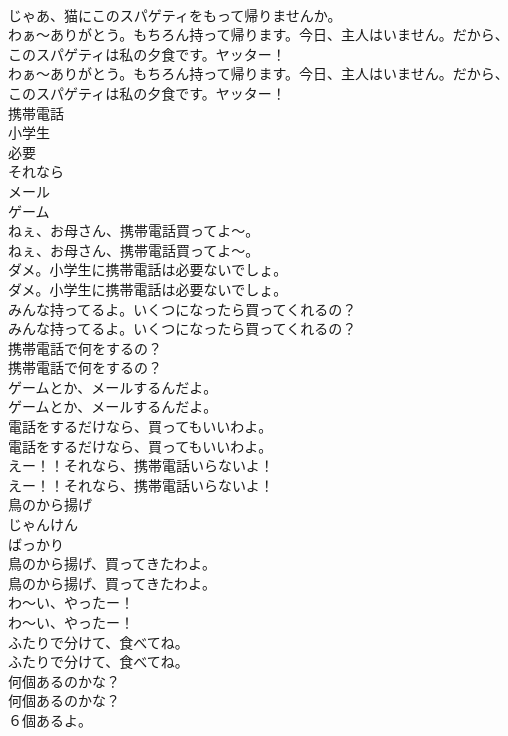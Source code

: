 \documentclass[8pt]{extreport}
\begin{document}
\begin{CJK}{UTF8}{min}
\\	じゃあ、猫にこのスパゲティをもって帰りませんか。 
\\	わぁ〜ありがとう。もちろん持って帰ります。今日、主人はいません。だから、このスパゲティは私の夕食です。ヤッター！	
\\	わぁ〜ありがとう。もちろん持って帰ります。今日、主人はいません。だから、このスパゲティは私の夕食です。ヤッター！ 
\\	携帯電話
\\	小学生
\\	必要
\\	それなら
\\	メール
\\	ゲーム
\\	ねぇ、お母さん、携帯電話買ってよ～。	
\\	ねぇ、お母さん、携帯電話買ってよ～。 
\\	ダメ。小学生に携帯電話は必要ないでしょ。	
\\	ダメ。小学生に携帯電話は必要ないでしょ。 
\\	みんな持ってるよ。いくつになったら買ってくれるの？	
\\	みんな持ってるよ。いくつになったら買ってくれるの？ 
\\	携帯電話で何をするの？	
\\	携帯電話で何をするの？ 
\\	ゲームとか、メールするんだよ。	
\\	ゲームとか、メールするんだよ。 
\\	電話をするだけなら、買ってもいいわよ。	
\\	電話をするだけなら、買ってもいいわよ。 
\\	えー！！それなら、携帯電話いらないよ！	
\\	えー！！それなら、携帯電話いらないよ！ 
\\	鳥のから揚げ
\\	じゃんけん
\\	ばっかり
\\	鳥のから揚げ、買ってきたわよ。	
\\	鳥のから揚げ、買ってきたわよ。 
\\	わ～い、やったー！	
\\	わ～い、やったー！ 
\\	ふたりで分けて、食べてね。	
\\	ふたりで分けて、食べてね。 
\\	何個あるのかな？	
\\	何個あるのかな？ 
\\	６個あるよ。	

\end{CJK}
\end{document}
